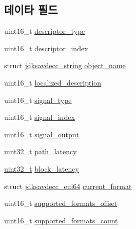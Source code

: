 \subsection*{데이타 필드}
\begin{DoxyCompactItemize}
\item 
uint16\+\_\+t \hyperlink{structjdksavdecc__descriptor__sensor__unit__cluster_ab7c32b6c7131c13d4ea3b7ee2f09b78d}{descriptor\+\_\+type}
\item 
uint16\+\_\+t \hyperlink{structjdksavdecc__descriptor__sensor__unit__cluster_a042bbc76d835b82d27c1932431ee38d4}{descriptor\+\_\+index}
\item 
struct \hyperlink{structjdksavdecc__string}{jdksavdecc\+\_\+string} \hyperlink{structjdksavdecc__descriptor__sensor__unit__cluster_a7d1f5945a13863b1762fc6db74fa8f80}{object\+\_\+name}
\item 
uint16\+\_\+t \hyperlink{structjdksavdecc__descriptor__sensor__unit__cluster_a0926f846ca65a83ad5bb06b4aff8f408}{localized\+\_\+description}
\item 
uint16\+\_\+t \hyperlink{structjdksavdecc__descriptor__sensor__unit__cluster_a248e60ef99d5ed1779989d1dd6b6dc5a}{signal\+\_\+type}
\item 
uint16\+\_\+t \hyperlink{structjdksavdecc__descriptor__sensor__unit__cluster_ae2e81a95ee9ad83f1fe22b6a1ee29075}{signal\+\_\+index}
\item 
uint16\+\_\+t \hyperlink{structjdksavdecc__descriptor__sensor__unit__cluster_ab4b91864e6fc335d7e86536d9f4461e4}{signal\+\_\+output}
\item 
\hyperlink{parse_8c_a6eb1e68cc391dd753bc8ce896dbb8315}{uint32\+\_\+t} \hyperlink{structjdksavdecc__descriptor__sensor__unit__cluster_a5527ea1fa3f885e9d2264e450e1635fa}{path\+\_\+latency}
\item 
\hyperlink{parse_8c_a6eb1e68cc391dd753bc8ce896dbb8315}{uint32\+\_\+t} \hyperlink{structjdksavdecc__descriptor__sensor__unit__cluster_ae2e9f0088d5e900b610d1b2818dfc559}{block\+\_\+latency}
\item 
struct \hyperlink{structjdksavdecc__eui64}{jdksavdecc\+\_\+eui64} \hyperlink{structjdksavdecc__descriptor__sensor__unit__cluster_ae56fc78e7074485bad557163524904c7}{current\+\_\+format}
\item 
uint16\+\_\+t \hyperlink{structjdksavdecc__descriptor__sensor__unit__cluster_a3484053d0dc58698d796644a57273dcb}{supported\+\_\+formats\+\_\+offset}
\item 
uint16\+\_\+t \hyperlink{structjdksavdecc__descriptor__sensor__unit__cluster_a3d054acc36c8fe6bc19ce257b4c18dfe}{supported\+\_\+formats\+\_\+count}

\end{DoxyCompactItemize}
